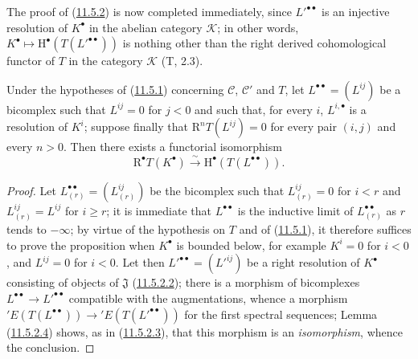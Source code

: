 \begin{env}[11.5.2.5]
\label{0.11.5.2.5}
The proof of (\hyperref[0.11.5.2]{11.5.2}) is now completed
immediately, since $L'^{\bullet\bullet}$ is an injective resolution of
$K^\bullet$ in the abelian category $\mathcal K$; in other words,
$K^\bullet\mapsto\mathrm H^\bullet(T(L'^{\bullet\bullet}))$ is nothing other than
the right derived cohomological functor of $T$ in the category $\mathcal K$
(T, 2.3).
\end{env}

\begin{proposition}[11.5.3]
\label{0.11.5.3}
Under the hypotheses of (\hyperref[0.11.5.1]{11.5.1}) concerning
$\mathcal C$, $\mathcal C'$ and $T$, let
$L^{\bullet\bullet}=(L^{ij})$ be a bicomplex such that $L^{ij}=0$ for $j<0$ and
such that, for every $i$, $L^{i,\bullet}$ is a resolution of $K^i$; suppose
finally that $\mathrm R^nT(L^{ij})=0$ for every pair $(i,j)$ and every $n>0$.
Then there exists a functorial isomorphism
\[
  \label{0.11.5.3.1}
  \mathrm R^\bullet T(K^\bullet)\xrightarrow{\sim}
  \mathrm H^\bullet(T(L^{\bullet\bullet})).
  \tag{11.5.3.1}
\]
\end{proposition}

\begin{proof}
Let $L_{(r)}^{\bullet\bullet}=(L_{(r)}^{ij})$ be the bicomplex such that
$L_{(r)}^{ij}=0$ for $i<r$ and $L_{(r)}^{ij}=L^{ij}$ for $i\geq r$; it is
immediate that $L^{\bullet\bullet}$ is the inductive limit of
$L_{(r)}^{\bullet\bullet}$ as $r$ tends to $-\infty$; by virtue of
the hypothesis on $T$ and of (\hyperref[0.11.5.1]{11.5.1}), it therefore suffices to
prove the proposition when $K^\bullet$ is bounded below, for
example $K^i=0$ for $i<0$, and $L^{ij}=0$ for $i<0$. Let then
$L'^{\bullet\bullet}=(L'^{ij})$ be a right resolution of $K^\bullet$ consisting
of objects of $\mathfrak J$ (\hyperref[0.11.5.2.2]{11.5.2.2}); there is a
morphism of bicomplexes
$L^{\bullet\bullet}\to L'^{\bullet\bullet}$ compatible with the
augmentations, whence a morphism
$'E(T(L^{\bullet\bullet}))\to{}'E(T(L'^{\bullet\bullet}))$ for the first
spectral sequences; Lemma (\hyperref[0.11.5.2.4]{11.5.2.4}) shows,
as in (\hyperref[0.11.5.2.3]{11.5.2.3}), that this morphism is an
\emph{isomorphism}, whence the conclusion.
\end{proof}

